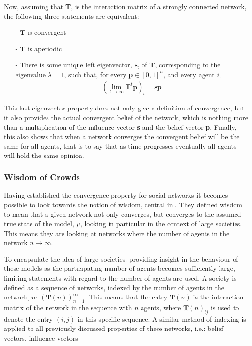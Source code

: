 \documentclass{article}
\newcommand{\T}{\textbf{T}}
\newcommand{\Soc}{(\T(n))^{\infty}_{n=1}}
\begin{document}
Now, assuming that \T, is the interaction matrix of a strongly connected network, the following three statements are equivalent:
\begin{itemize}
    \item[-] $\T$ is convergent
    \item[-] $\T$ is aperiodic
    \item[-] There is some unique left eigenvector, \textbf{s}, of \T, corresponding to the eigenvalue $\lambda=1$, such that, for every \textbf{p}$\in [0,1]^n$, and every agent $i$,
    \begin{align*}
        (\lim_{t\to\infty}\T^t\textbf{p})_i = \textbf{sp}
    \end{align*}
\end{itemize}

 This last eigenvector property does not only give a definition of convergence, but it also provides the actual convergent belief of the network, which is nothing more than a multiplication of the influence vector \textbf{s} and the belief vector \textbf{p}. Finally, this also shows that when a network converges the convergent belief will be the same for all agents, that is to say that as time progresses eventually all agents will hold the same opinion.

\newpage

\subsubsection{Wisdom of Crowds}

Having established the convergence property for social networks it becomes possible to look towards the notion of wisdom, central in \cite{golub2010naive}. They defined wisdom to mean that a given network not only converges, but converges to the assumed true state of the model, $\mu$, looking in particular in the context of large societies. This means they are looking at networks where the number of agents in the network $n\to\infty$.

To encapsulate the idea of large societies, providing insight in the behaviour of these models as the participating number of agents becomes sufficiently large, limiting statements with regard to the number of agents are used. A society is defined as a sequence of networks, indexed by the number of agents in the network, $n$: $\Soc$. This means that the entry $\textbf{T}(n)$ is the interaction matrix of the network in the sequence with $n$ agents, where $\textbf{T}(n)_{ij}$ is used to denote the entry $(i,j)$ in this specific sequence. A similar method of indexing is applied to all previously discussed properties of these networks, i.e.: belief vectors, influence vectors.
\end{document}
